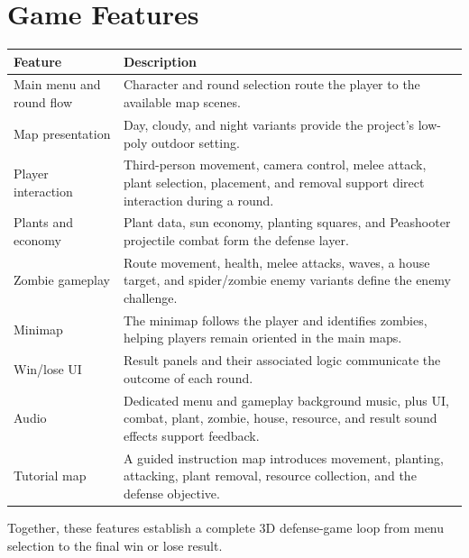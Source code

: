 \section{Game Features}

\begin{longtable}{p{}p{}}
\toprule
Feature & Description\\
\midrule
Main menu and round flow & Character and round selection route the player to the available map scenes.\\
Map presentation & Day, cloudy, and night variants provide the project's low-poly outdoor setting.\\
Player interaction & Third-person movement, camera control, melee attack, plant selection, placement, and removal support direct interaction during a round.\\
Plants and economy & Plant data, sun economy, planting squares, and Peashooter projectile combat form the defense layer.\\
Zombie gameplay & Route movement, health, melee attacks, waves, a house target, and spider/zombie enemy variants define the enemy challenge.\\
Minimap & The minimap follows the player and identifies zombies, helping players remain oriented in the main maps.\\
Win/lose UI & Result panels and their associated logic communicate the outcome of each round.\\
Audio & Dedicated menu and gameplay background music, plus UI, combat, plant, zombie, house, resource, and result sound effects support feedback.\\
Tutorial map & A guided instruction map introduces movement, planting, attacking, plant removal, resource collection, and the defense objective.\\
\bottomrule
\end{longtable}

Together, these features establish a complete 3D defense-game loop from menu selection to the final win or lose result.
